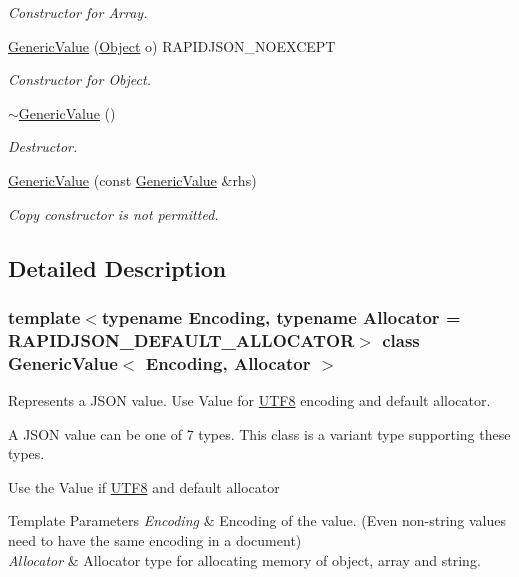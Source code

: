 \begin{DoxyCompactItemize}
\begin{DoxyCompactList}\small\item\em Constructor for Array. \end{DoxyCompactList}\item 
\hyperlink{classGenericValue_a9c294e56f4ab940f845f7c171b183483}{Generic\+Value} (\hyperlink{classGenericValue_aee3606d69d411ce0d98f29639585989b}{Object} o) R\+A\+P\+I\+D\+J\+S\+O\+N\+\_\+\+N\+O\+E\+X\+C\+E\+PT
\begin{DoxyCompactList}\small\item\em Constructor for Object. \end{DoxyCompactList}\item 
\hyperlink{classGenericValue_a213ba89ef5ef961a5e655bd8c78ac9f4}{$\sim$\+Generic\+Value} ()
\begin{DoxyCompactList}\small\item\em Destructor. \end{DoxyCompactList}\item 
\hyperlink{classGenericValue_ac5bfd54b6bdea215716df69c501d5cf3}{Generic\+Value} (const \hyperlink{classGenericValue}{Generic\+Value} \&rhs)
\begin{DoxyCompactList}\small\item\em Copy constructor is not permitted. \end{DoxyCompactList}\end{DoxyCompactItemize}


\subsection{Detailed Description}
\subsubsection*{template$<$typename Encoding, typename Allocator = R\+A\+P\+I\+D\+J\+S\+O\+N\+\_\+\+D\+E\+F\+A\+U\+L\+T\+\_\+\+A\+L\+L\+O\+C\+A\+T\+OR$>$\newline
class Generic\+Value$<$ Encoding, Allocator $>$}

Represents a J\+S\+ON value. Use Value for \hyperlink{structUTF8}{U\+T\+F8} encoding and default allocator. 

A J\+S\+ON value can be one of 7 types. This class is a variant type supporting these types.

Use the Value if \hyperlink{structUTF8}{U\+T\+F8} and default allocator


\begin{DoxyTemplParams}{Template Parameters}
{\em Encoding} & Encoding of the value. (Even non-\/string values need to have the same encoding in a document) \\
\hline
{\em Allocator} & Allocator type for allocating memory of object, array and string. \\
\hline
\end{DoxyTemplParams}


